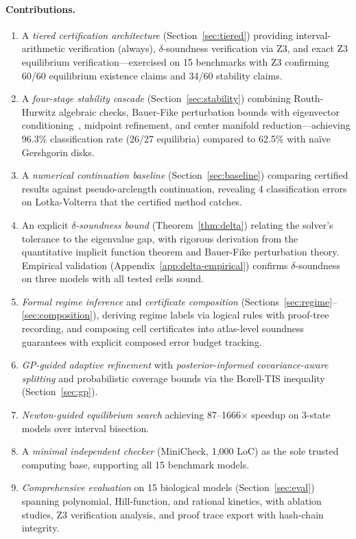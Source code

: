 \documentclass[11pt]{article}
\begin{document}
\paragraph{Contributions.}
\begin{enumerate}[leftmargin=*]
\item A \emph{tiered certification architecture} (Section~\ref{sec:tiered}) providing interval-arithmetic verification (always), $\delta$-soundness verification via Z3, and exact Z3 equilibrium verification---exercised on 15 benchmarks with Z3 confirming 60/60 equilibrium existence claims and 34/60 stability claims.

\item A \emph{four-stage stability cascade} (Section~\ref{sec:stability}) combining Routh-Hurwitz algebraic checks, Bauer-Fike perturbation bounds with eigenvector conditioning~\cite{bauer1960norms}, midpoint refinement, and center manifold reduction---achieving 96.3\% classification rate (26/27 equilibria) compared to 62.5\% with na\"ive Gershgorin disks.

\item A \emph{numerical continuation baseline} (Section~\ref{sec:baseline}) comparing certified results against pseudo-arclength continuation, revealing 4 classification errors on Lotka-Volterra that the certified method catches.

\item An explicit \emph{$\delta$-soundness bound} (Theorem~\ref{thm:delta}) relating the solver's tolerance to the eigenvalue gap, with rigorous derivation from the quantitative implicit function theorem and Bauer-Fike perturbation theory.  Empirical validation (Appendix~\ref{app:delta-empirical}) confirms $\delta$-soundness on three models with all tested cells sound.

\item \emph{Formal regime inference} and \emph{certificate composition} (Sections~\ref{sec:regime}--\ref{sec:composition}), deriving regime labels via logical rules with proof-tree recording, and composing cell certificates into atlas-level soundness guarantees with explicit composed error budget tracking.

\item \emph{GP-guided adaptive refinement} with \emph{posterior-informed covariance-aware splitting} and probabilistic coverage bounds via the Borell-TIS inequality (Section~\ref{sec:gp}).

\item \emph{Newton-guided equilibrium search} achieving 87--1666$\times$ speedup on 3-state models over interval bisection.

\item A \emph{minimal independent checker} (MiniCheck, 1{,}000 LoC) as the sole trusted computing base, supporting all 15 benchmark models.

\item \emph{Comprehensive evaluation} on 15 biological models (Section~\ref{sec:eval}) spanning polynomial, Hill-function, and rational kinetics, with ablation studies, Z3 verification analysis, and proof trace export with hash-chain integrity.
\end{enumerate}
\end{document}
